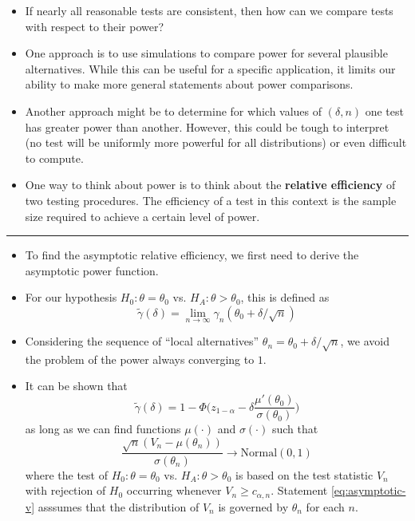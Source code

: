 \documentclass[]{book}
\begin{document}
\begin{itemize}
\item
  If nearly all reasonable tests are consistent, then
  how can we compare tests with respect to their power?
\item
  One approach is to use simulations to compare power for several plausible alternatives.
  While this can be useful for a specific application, it limits
  our ability to make more general statements about power comparisons.
\item
  Another approach might be to determine
  for which values of \((\delta, n)\) one test has
  greater power than another. However, this could
  be tough to interpret (no test will be uniformly more powerful for all distributions)
  or even difficult to compute.
\item
  One way to think about power is to think about the \textbf{relative efficiency} of
  two testing procedures. The efficiency of a test in this context is
  the sample size required to achieve a certain level of power.
\end{itemize}

\begin{center}\rule{0.5\linewidth}{\linethickness}\end{center}

\begin{itemize}
\item
  To find the asymptotic relative efficiency, we first need to derive the
  asymptotic power function.
\item
  For our hypothesis \(H_{0}: \theta = \theta_{0}\) vs. \(H_{A}: \theta > \theta_{0}\), this is defined as
  \begin{equation}
  \tilde{\gamma}(\delta) = \lim_{n \longrightarrow \infty} \gamma_{n}( \theta_{0} + \delta/\sqrt{n}) \nonumber
  \end{equation}
\item
  Considering the sequence of ``local alternatives'' \(\theta_{n} = \theta_{0} + \delta/\sqrt{n}\),
  we avoid the problem of the power always converging to \(1\).
\item
  It can be shown that
  \begin{equation}
  \tilde{\gamma}(\delta) = 1 - \Phi\Bigg( z_{1-\alpha} - \delta \frac{\mu'(\theta_{0})}{\sigma(\theta_{0})} \Bigg)
  \end{equation}
  as long as we can find functions \(\mu(\cdot)\) and \(\sigma(\cdot)\) such that
  \begin{equation}
  \frac{\sqrt{n}(V_{n} - \mu(\theta_{n}))}{ \sigma(\theta_{n})} \longrightarrow \textrm{Normal}(0, 1) 
  \label{eq:asymptotic-v}
  \end{equation}
  where the test of \(H_{0}:\theta = \theta_{0}\) vs. \(H_{A}: \theta > \theta_{0}\)
  is based on the test statistic \(V_{n}\) with rejection of \(H_{0}\) occurring whenever \(V_{n} \geq c_{\alpha, n}\).
  Statement \eqref{eq:asymptotic-v} asssumes that the distribution of \(V_{n}\) is governed by \(\theta_{n}\) for each \(n\).
\end{itemize}
\end{document}
